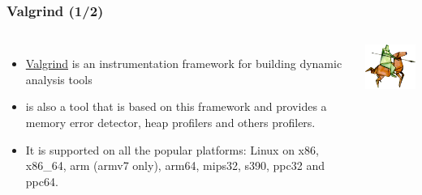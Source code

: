 \begin{frame}
  \frametitle{Valgrind (1/2)}
  \begin{columns}[T]
    \begin{itemize}
      \item \href{https://valgrind.org/}{Valgrind} is an instrumentation
            framework for building dynamic analysis tools
      \item {} is also a tool that is based on this framework
            and provides a memory error detector, heap profilers and others
            profilers.
      \item It is supported on all the popular platforms: Linux on x86, x86\_64,
            arm (armv7 only), arm64, mips32, s390, ppc32 and ppc64.
    \end{itemize}
    \includegraphics[width=\textwidth]{../common/valgrind1.png}
  \end{columns}
\end{frame}

